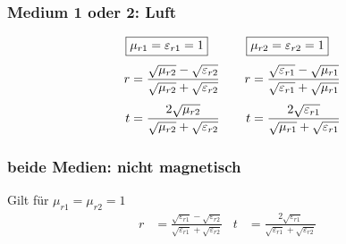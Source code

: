 \subsubsection{Medium 1 oder 2: Luft}
\begin{equation*}
	\setlength{\jot}{6pt}
	\begin{aligned}[t]
   		\Aboxed{ & \mu_{r1} = \varepsilon_{r1} = 1}                                                            \\
		r        & = \frac{\sqrt{\mu_{r2}}-\sqrt{\varepsilon_{r2}}}{{\sqrt{\mu_{r2}}+\sqrt{\varepsilon_{r2}}}} \\
		t        & = \frac{2\sqrt{\mu_{r2}}}{\sqrt{\mu_{r2}}+\sqrt{\varepsilon_{r2}}}
	\end{aligned}
	\qquad
	\begin{aligned}[t]
  		\Aboxed{ & \mu_{r2} = \varepsilon_{r2} = 1}                                                            \\
		r        & = \frac{\sqrt{\varepsilon_{r1}}-\sqrt{\mu_{r1}}}{{\sqrt{\varepsilon_{r1}}+\sqrt{\mu_{r1}}}} \\
		t        & = \frac{2\sqrt{\varepsilon_{r1}}}{\sqrt{\mu_{r1}}+\sqrt{\varepsilon_{r1}}}
	\end{aligned}
\end{equation*}

%


\subsubsection{beide Medien: nicht magnetisch}
Gilt für $\mu_{r1} = \mu_{r2} = 1$
\begin{align*}
    r        & = \frac{\sqrt{\varepsilon_{r1}}-\sqrt{\varepsilon_{r2}}}{{\sqrt{\varepsilon_{r1}}+\sqrt{\varepsilon_{r2}}}}&
    t        & = \frac{2\sqrt{\varepsilon_{r1}}}{\sqrt{\varepsilon_{r1}}+\sqrt{\varepsilon_{r2}}}&
\end{align*}

